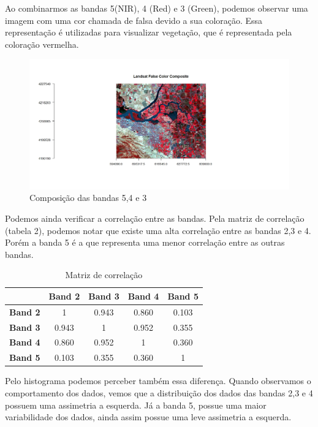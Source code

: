 \documentclass[a4paper,12pt]{article}
\begin{document}
Ao combinarmos as bandas 5(NIR), 4 (Red) e 3 (Green), podemos observar uma imagem com uma cor chamada de falsa devido a sua coloração. Essa representação é utilizadas para visualizar vegetação, que é representada pela coloração vermelha.

\begin{center}
\begin{figure}[H]
    \centering
    \includegraphics[width = 1 \textwidth]{comp 543.jpeg}
    \caption{Composição das bandas 5,4 e 3 }
\end{figure}    
\end{center}

Podemos ainda verificar a correlação entre as bandas. Pela matriz de correlação (tabela 2), podemos notar que existe uma alta correlação entre as bandas 2,3 e 4. Porém a banda 5 é a que representa uma menor correlação entre as outras bandas.

\begin{table}[ht]
\centering
\caption{Matriz de correlação} \label{tab:exemplo}
\begin{tabular}{c c c c c}
\hline
  & \textbf{Band 2} &  \textbf{Band 3} &  \textbf{Band 4} &  \textbf{Band 5}\\
\hline 
\textbf{Band 2} & 1 & 0.943 & 0.860 & 0.103 \\
\textbf{Band 3} & 0.943 & 1 & 0.952 & 0.355 \\
\textbf{Band 4} & 0.860 & 0.952 & 1 & 0.360 \\
\textbf{Band 5} & 0.103 & 0.355 & 0.360 & 1 \\
\hline
\end{tabular}
\end{table}

Pelo histograma podemos perceber também essa diferença. Quando observamos o comportamento dos dados, vemos que a distribuição dos dados das bandas 2,3 e 4 possuem uma assimetria a esquerda. Já a banda 5, possue uma maior variabilidade dos dados, ainda assim possue uma leve assimetria a esquerda.
\end{document}
